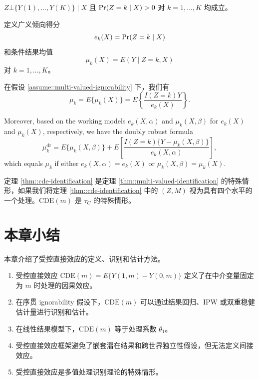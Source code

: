 \begin{Assumption}
\label{assume::multi-valued-ignorability}
$Z \bot \{Y(1),\ldots,Y(K)\} \mid X$ 且 $\operatorname{Pr}(Z=k\mid X)>0$ 对 $k=1,\ldots,K$ 均成立。
\end{Assumption}

定义广义倾向得分
\begin{equation}
e_k(X) = \operatorname{Pr}(Z=k\mid X)
\end{equation}
和条件结果均值
\begin{equation}
\mu_k(X) = E(Y\mid Z=k,X)
\end{equation}
对 $k=1,\ldots,K$。

\begin{Theorem}[多值处理的识别]
\label{thm::multi-valued-identification}
在假设 \ref{assume::multi-valued-ignorability} 下，我们有
\begin{equation}
\mu_k = E\{\mu_k(X)\} = E\left\{\frac{I(Z=k)Y}{e_k(X)}\right\}.
\end{equation}

Moreover, based on the working models $e_k(X,\alpha)$ and $\mu_k(X,\beta)$ for $e_k(X)$ and $\mu_k(X)$, respectively, we have the doubly robust formula
\begin{equation}
\mu_k^{\mathrm{dr}} = E\{\mu_k(X,\beta)\} + E\left[\frac{I(Z=k)\{Y-\mu_k(X,\beta)\}}{e_k(X,\alpha)}\right],
\end{equation}
which equals $\mu_k$ if either $e_k(X,\alpha)=e_k(X)$ or $\mu_k(X,\beta)=\mu_k(X)$.
\end{Theorem}

\begin{Remark}
定理 \ref{thm::cde-identification} 是定理 \ref{thm::multi-valued-identification} 的特殊情形，如果我们将定理 \ref{thm::cde-identification} 中的 $(Z,M)$ 视为具有四个水平的一个处理。$\mathrm{CDE}(m)$ 是 $\tau_C$ 的特殊情形。
\end{Remark}

\section{本章小结}
\label{sec::cde-summary}

本章介绍了受控直接效应的定义、识别和估计方法。

\begin{enumerate}
\item 受控直接效应 $\mathrm{CDE}(m)=E\{Y(1,m)-Y(0,m)\}$ 定义了在中介变量固定为 $m$ 时处理的因果效应。
\item 在序贯 ignorability 假设下，$\mathrm{CDE}(m)$ 可以通过结果回归、IPW 或双重稳健估计量进行识别和估计。
\item 在线性结果模型下，$\mathrm{CDE}(m)$ 等于处理系数 $\theta_1$。
\item 受控直接效应框架避免了嵌套潜在结果和跨世界独立性假设，但无法定义间接效应。
\item 受控直接效应是多值处理识别理论的特殊情形。
\end{enumerate}

